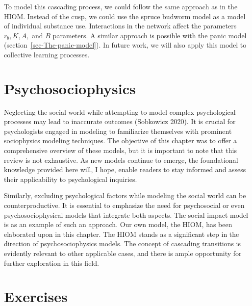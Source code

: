 \documentclass[
  a4paper,
  DIV=11,
  numbers=noendperiod,
  oneside]{scrreprt}
\begin{document}
To model this cascading process, we could follow the same approach as in
the HIOM. Instead of the cusp, we could use the spruce budworm model as
a model of individual substance use. Interactions in the network affect
the parameters \(r_{b}, K, A,\) and \(B\) parameters. A similar approach
is possible with the panic model (section~\ref{sec-The-panic-model}). In
future work, we will also apply this model to collective learning
processes.

\section{Psychosociophysics}\label{sec-Psychosociophysics}

Neglecting the social world while attempting to model complex
psychological processes may lead to inaccurate outcomes (Sobkowicz
2020). It is crucial for psychologists engaged in modeling to
familiarize themselves with prominent sociophysics modeling techniques.
The objective of this chapter was to offer a comprehensive overview of
these models, but it is important to note that this review is not
exhaustive. As new models continue to emerge, the foundational knowledge
provided here will, I hope, enable readers to stay informed and assess
their applicability to psychological inquiries.

Similarly, excluding psychological factors while modeling the social
world can be counterproductive. It is essential to emphasize the need
for psychosocial or even psychosociophysical models that integrate both
aspects. The social impact model is as an example of such an approach.
Our own model, the HIOM, has been elaborated upon in this chapter. The
HIOM stands as a significant step in the direction of psychosociophysics
models. The concept of cascading transitions is evidently relevant to
other applicable cases, and there is ample opportunity for further
exploration in this field.

\section{Exercises}\label{sec-Exercises-ch7}
\end{document}
